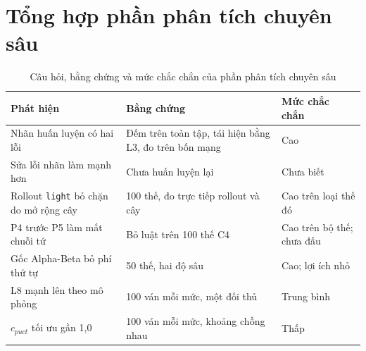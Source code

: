 \section{Tổng hợp phần phân tích chuyên sâu}
\begin{table}[H]
  \centering\small
  \caption{Câu hỏi, bằng chứng và mức chắc chắn của phần phân tích chuyên sâu}
  \label{tab:cs-tong-hop}
  \begin{tabular}{p{4.6cm}p{6.4cm}p{3cm}}
    \toprule
    Phát hiện & Bằng chứng & Mức chắc chắn\\
    \midrule
    Nhãn huấn luyện có hai lỗi & Đếm trên toàn tập, tái hiện bằng L3, đo trên bốn mạng & Cao\\
    Sửa lỗi nhãn làm mạnh hơn & Chưa huấn luyện lại & Chưa biết\\
    Rollout \texttt{light} bỏ chặn do mở rộng cây & 100 thế, đo trực tiếp rollout và cây & Cao trên loại thế đó\\
    P4 trước P5 làm mất chuỗi tứ & Bỏ luật trên 100 thế C4 & Cao trên bộ thế; chưa đấu\\
    Gốc Alpha-Beta bỏ phí thứ tự & 50 thế, hai độ sâu & Cao; lợi ích nhỏ\\
    L8 mạnh lên theo mô phỏng & 100 ván mỗi mức, một đối thủ & Trung bình\\
    $c_{puct}$ tối ưu gần 1,0 & 100 ván mỗi mức, khoảng chồng nhau & Thấp\\
    \bottomrule
  \end{tabular}
\end{table}
